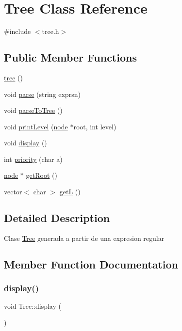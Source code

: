 \hypertarget{class_tree}{}\section{Tree Class Reference}
\label{class_tree}


{\ttfamily \#include $<$tree.\+h$>$}

\subsection*{Public Member Functions}
\begin{DoxyCompactItemize}
\item 
\hyperlink{class_tree_a7bebcbdd3651d31b2adeb82e8817a720}{tree} ()
\item 
void \hyperlink{class_tree_a0a58a389239c81cca1005635279ff5b4}{parse} (string exprsn)
\item 
void \hyperlink{class_tree_a732a521b8b2989336a4fb080afb28f52}{parse\+To\+Tree} ()
\item 
void \hyperlink{class_tree_a105cab53eb81166b616ed80135de2791}{print\+Level} (\hyperlink{structnode}{node} $\ast$root, int level)
\item 
void \hyperlink{class_tree_a90314f21e177371ae8f964c87d126453}{display} ()
\item 
int \hyperlink{class_tree_a174fbb13ce6ff6cc899c226ae4d04b02}{priority} (char a)
\item 
\hyperlink{structnode}{node} $\ast$ \hyperlink{class_tree_a506b3e509bb7e709cea6f8b07bc24e02}{get\+Root} ()
\item 
vector$<$ char $>$ \hyperlink{class_tree_a9acb0c1a6d759b7b74182cc6154ebefb}{getL} ()
\end{DoxyCompactItemize}


\subsection{Detailed Description}
Clase \hyperlink{class_tree}{Tree} generada a partir de una expresion regular 

\subsection{Member Function Documentation}
\hypertarget{class_tree_a90314f21e177371ae8f964c87d126453}{}\label{class_tree_a90314f21e177371ae8f964c87d126453} 
\subsubsection{\texorpdfstring{display()}{display()}}
{\footnotesize\ttfamily void Tree\+::display (\begin{DoxyParamCaption}{ }\end{DoxyParamCaption})}

